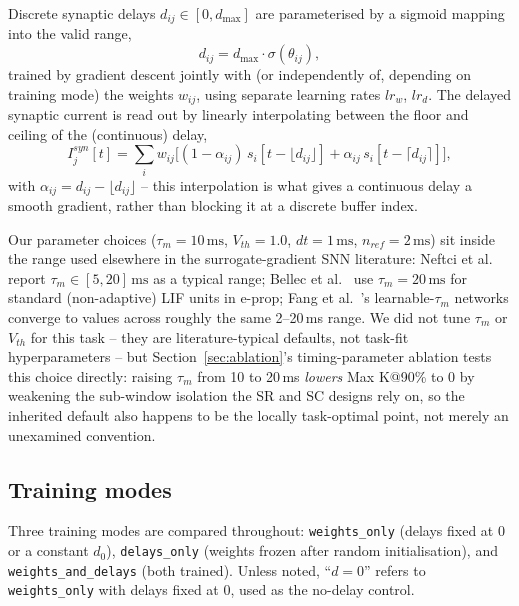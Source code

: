 \documentclass[conference]{IEEEtran}
\begin{document}
Discrete synaptic delays $d_{ij}\in[0,d_{\max}]$ are parameterised by a sigmoid mapping
into the valid range,
\begin{equation}
d_{ij} = d_{\max}\cdot\sigma(\theta_{ij}),
\label{eq:delayparam}
\end{equation}
trained by gradient descent jointly with (or independently of, depending on training
mode) the weights $w_{ij}$, using separate learning rates $lr_w$, $lr_d$. The delayed
synaptic current is read out by linearly interpolating between the floor and ceiling of
the (continuous) delay,
\begin{equation}
I_j^{syn}[t] = \sum_i w_{ij}\Big[(1-\alpha_{ij})\,s_i[t{-}\lfloor d_{ij}\rfloor]
+ \alpha_{ij}\,s_i[t{-}\lceil d_{ij}\rceil]\Big],
\label{eq:delayread}
\end{equation}
with $\alpha_{ij}=d_{ij}-\lfloor d_{ij}\rfloor$ -- this interpolation is what gives a
continuous delay a smooth gradient, rather than blocking it at a discrete buffer index.

Our parameter choices ($\tau_m{=}10\,\mathrm{ms}$, $V_{th}{=}1.0$, $dt{=}1\,\mathrm{ms}$,
$n_{ref}{=}2\,\mathrm{ms}$) sit inside the range used elsewhere in the surrogate-gradient
SNN literature: Neftci et al.\ \cite{neftci2019surrogate} report $\tau_m\in[5,20]\,\mathrm{ms}$
as a typical range; Bellec et al.\ \cite{bellec2020solution} use $\tau_m{=}20\,\mathrm{ms}$
for standard (non-adaptive) LIF units in e-prop; Fang et al.\ \cite{fang2021plif}'s
learnable-$\tau_m$ networks converge to values across roughly the same 2--20\,ms range.
We did not tune $\tau_m$ or $V_{th}$ for this task -- they are literature-typical
defaults, not task-fit hyperparameters -- but Section~\ref{sec:ablation}'s
timing-parameter ablation tests this choice directly: raising $\tau_m$ from 10 to
20\,ms \emph{lowers} Max K@90\% to 0 by weakening the sub-window isolation the SR and SC
designs rely on, so the inherited default also happens to be the locally task-optimal
point, not merely an unexamined convention.

\subsection{Training modes}
Three training modes are compared throughout: \texttt{weights\_only} (delays fixed at 0
or a constant $d_0$), \texttt{delays\_only} (weights frozen after random initialisation),
and \texttt{weights\_and\_delays} (both trained). Unless noted, ``$d{=}0$'' refers to
\texttt{weights\_only} with delays fixed at 0, used as the no-delay control.
\end{document}
